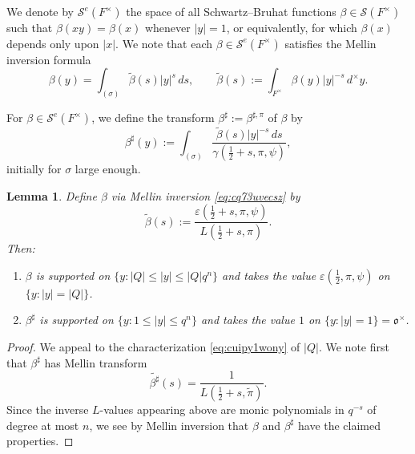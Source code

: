 \documentclass[reqno]{amsart}
\theoremstyle{plain}
\newtheorem{lemma}[theorem]{Lemma}
\theoremstyle{definition}
\begin{document}
We denote by $\mathcal{S}^{e}(F^\times)$ the space of all Schwartz--Bruhat functions $\beta \in \mathcal{S}(F^\times)$ such that $\beta(x y) = \beta(x)$ whenever $\lvert y \rvert = 1$, or equivalently, for which $\beta(x)$ depends only upon $\lvert x\rvert$.  We note that each $\beta \in \mathcal{S}^{e}(F^\times)$ satisfies the Mellin inversion formula
\begin{equation}\label{eq:cq73uvecsz}
  \beta(y) = \int_{(\sigma)} \tilde{\beta}(s) \lvert y \rvert^s
  \, d s,
  \qquad \tilde{\beta}(s) := \int_{F^\times} \beta(y) \lvert y \rvert^{-s} \,d^\times y.
\end{equation}

For $\beta \in \mathcal{S}^e(F^\times)$, we define the transform $\beta^\sharp := \beta^{\sharp, \pi}$ of $\beta$ by
\begin{equation*}
    \beta^\sharp(y) :=
    \int_{(\sigma)}
    \frac{
      \tilde{\beta}(s)
      \lvert y \rvert^{- s}
      \, d s}{\gamma(\tfrac{1}{2} + s, \pi, \psi)},
  \end{equation*}
initially for $\sigma$ large enough.
\begin{lemma}\label{example:cq4jqru7rh}
  Define $\beta$ via Mellin inversion \eqref{eq:cq73uvecsz} by
  \begin{equation*}
    \tilde{\beta}(s) := \frac{\varepsilon(\tfrac{1}{2} + s, \pi, \psi)}{L(\tfrac{1}{2} + s, \pi)}.
  \end{equation*}
  Then:
  \begin{enumerate}
  \item $\beta$ is supported on $\{y : \lvert Q \rvert \leq \lvert y \rvert \leq \lvert Q \rvert q^n \}$ and takes the value $\varepsilon(\tfrac{1}{2}, \pi, \psi)$ on $\{y : \lvert y \rvert = \lvert Q \rvert\}$.
  \item $\beta^\sharp$ is supported on $\{y : 1 \leq \lvert y \rvert \leq q^n\}$ and takes the value $1$ on $\{y : \lvert y \rvert = 1\} = \mathfrak{o}^\times$.
  \end{enumerate}
\end{lemma}
\begin{proof}
  We appeal to the characterization \eqref{eq:cuipy1wony} of $\lvert Q \rvert$.  We note first that $\beta^\sharp$ has Mellin transform
  \begin{equation*}
    \widetilde{\beta^\sharp} (s) = \frac{1}{L(\tfrac{1}{2} + s, \tilde{\pi})}.
  \end{equation*}
  Since the inverse $L$-values appearing above are monic polynomials in $q^{- s}$ of degree at most $n$, we see by Mellin inversion that $\beta$ and $\beta^\sharp$ have the claimed properties.
\end{proof}
\end{document}
